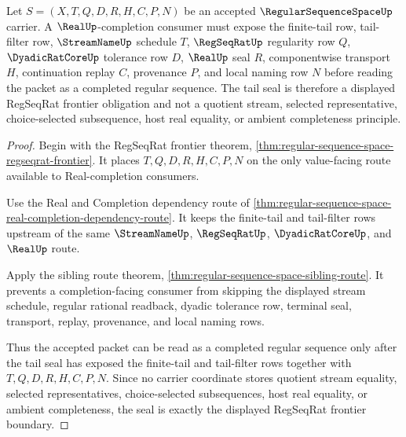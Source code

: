 \begin{theorem}
\label{thm:regular-sequence-space-regseqrat-frontier-tail-seal}
Let $S=(X,T,Q,D,R,H,C,P,N)$ be an accepted $\RegularSequenceSpaceUp$ carrier. A $\RealUp$-completion consumer must expose the finite-tail row, tail-filter row, $\StreamNameUp$ schedule $T$, $\RegSeqRatUp$ regularity row $Q$, $\DyadicRatCoreUp$ tolerance row $D$, $\RealUp$ seal $R$, componentwise transport $H$, continuation replay $C$, provenance $P$, and local naming row $N$ before reading the packet as a completed regular sequence. The tail seal is therefore a displayed RegSeqRat frontier obligation and not a quotient stream, selected representative, choice-selected subsequence, host real equality, or ambient completeness principle.
\end{theorem}
\begin{proof}
Begin with the RegSeqRat frontier theorem, \autoref{thm:regular-sequence-space-regseqrat-frontier}. It places $T,Q,D,R,H,C,P,N$ on the only value-facing route available to Real-completion consumers.

Use the Real and Completion dependency route of \autoref{thm:regular-sequence-space-real-completion-dependency-route}. It keeps the finite-tail and tail-filter rows upstream of the same $\StreamNameUp$, $\RegSeqRatUp$, $\DyadicRatCoreUp$, and $\RealUp$ route.

Apply the sibling route theorem, \autoref{thm:regular-sequence-space-sibling-route}. It prevents a completion-facing consumer from skipping the displayed stream schedule, regular rational readback, dyadic tolerance row, terminal seal, transport, replay, provenance, and local naming rows.

Thus the accepted packet can be read as a completed regular sequence only after the tail seal has exposed the finite-tail and tail-filter rows together with $T,Q,D,R,H,C,P,N$. Since no carrier coordinate stores quotient stream equality, selected representatives, choice-selected subsequences, host real equality, or ambient completeness, the seal is exactly the displayed RegSeqRat frontier boundary.
\end{proof}

